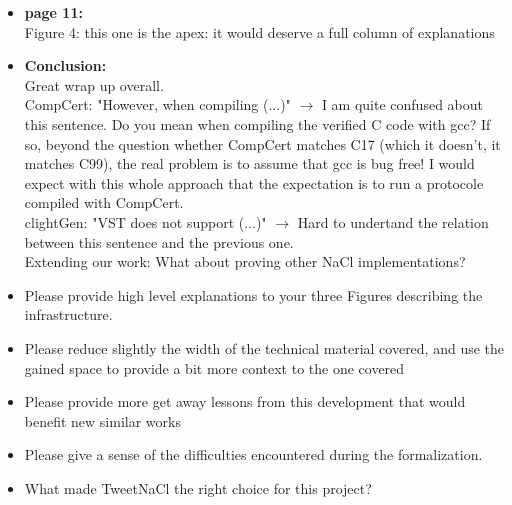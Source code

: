 \begin{itemize}
    \item \textbf{page 11:}\\
          Figure 4: this one is the apex: it would deserve a full column of explanations

    \item \textbf{Conclusion:}\\
          Great wrap up overall.\\
          CompCert: "However, when compiling (...)" $\rightarrow$ I am quite confused about this sentence. Do you mean when compiling the verified C code with gcc? If so, beyond the question whether CompCert matches C17 (which it doesn't, it matches C99), the real problem is to assume that gcc is bug free! I would expect with this whole approach that the expectation is to run a protocole compiled with CompCert.\\
          clightGen: "VST does not support (...)" $\rightarrow$ Hard to undertand the relation between this sentence and the previous one.\\
          Extending our work: What about proving other NaCl implementations?
\end{itemize}

\begin{answer}
\end{answer}

\begin{center}
\end{center}
\begin{itemize}
    \item Please provide high level explanations to your three Figures describing the infrastructure.
    \item Please reduce slightly the width of the technical material covered, and use the gained space to provide a bit more context to the one covered
    \item Please provide more get away lessons from this development that would benefit new similar works
    \item Please give a sense of the difficulties encountered during the formalization.
\end{itemize}

\begin{center}
\end{center}

\begin{itemize}
    \item What made TweetNaCl the right choice for this project?
\end{itemize}

